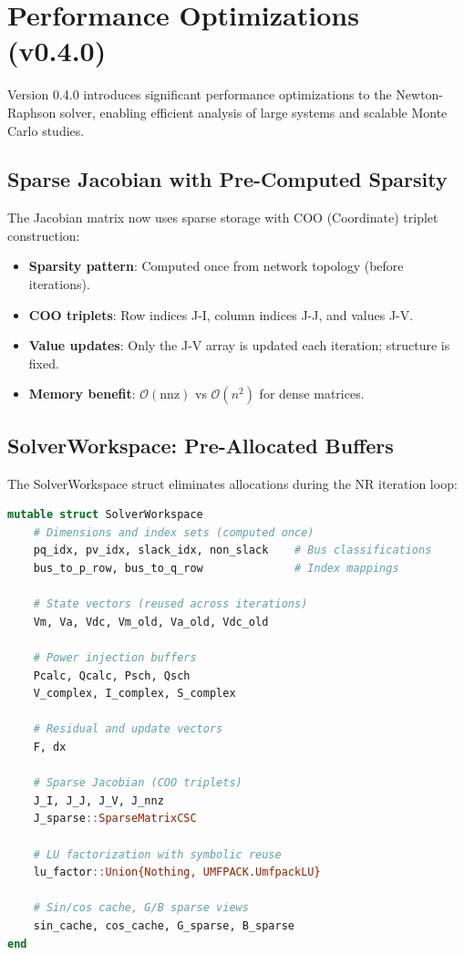 \documentclass[11pt]{article}
\def\code#1{#1}%
\def\_{-}%
\newcommand{\code}[1]{\nolinkurl{#1}}
\begin{document}
\section{Performance Optimizations (v0.4.0)}\label{sec:performance}

Version 0.4.0 introduces significant performance optimizations to the Newton-Raphson solver, enabling efficient analysis of large systems and scalable Monte Carlo studies.

\subsection{Sparse Jacobian with Pre-Computed Sparsity}
The Jacobian matrix now uses sparse storage with COO (Coordinate) triplet construction:
\begin{itemize}[leftmargin=*]
  \item \textbf{Sparsity pattern}: Computed once from network topology (before iterations).
  \item \textbf{COO triplets}: Row indices \code{J\_I}, column indices \code{J\_J}, and values \code{J\_V}.
  \item \textbf{Value updates}: Only the \code{J\_V} array is updated each iteration; structure is fixed.
  \item \textbf{Memory benefit}: $\mathcal{O}(\text{nnz})$ vs $\mathcal{O}(n^2)$ for dense matrices.
\end{itemize}

\subsection{SolverWorkspace: Pre-Allocated Buffers}
The \code{SolverWorkspace} struct eliminates allocations during the NR iteration loop:
\begin{lstlisting}[language=Julia]
mutable struct SolverWorkspace
    # Dimensions and index sets (computed once)
    pq_idx, pv_idx, slack_idx, non_slack    # Bus classifications
    bus_to_p_row, bus_to_q_row              # Index mappings
    
    # State vectors (reused across iterations)
    Vm, Va, Vdc, Vm_old, Va_old, Vdc_old
    
    # Power injection buffers
    Pcalc, Qcalc, Psch, Qsch
    V_complex, I_complex, S_complex
    
    # Residual and update vectors
    F, dx
    
    # Sparse Jacobian (COO triplets)
    J_I, J_J, J_V, J_nnz
    J_sparse::SparseMatrixCSC
    
    # LU factorization with symbolic reuse
    lu_factor::Union{Nothing, UMFPACK.UmfpackLU}
    
    # Sin/cos cache, G/B sparse views
    sin_cache, cos_cache, G_sparse, B_sparse
end
\end{lstlisting}
\end{document}
